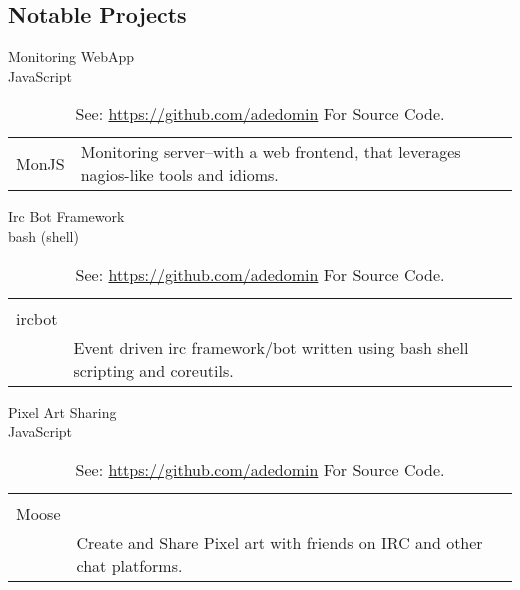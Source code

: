 \documentclass[letterpaper,]{article}
\begin{document}
\subsection{Notable Projects}\label{projects}

\begin{table}[H]
    \centering
    \begin{minipage}[t]{0.30\linewidth}
        \centering
        \caption{
            Monitoring WebApp \\ 
            \fontsize{8}{10}\selectfont JavaScript
        }
        \begin{tabularx}{\textwidth}{r|X}
            MonJS & 
            Monitoring server--with a web frontend, 
            that leverages nagios-like 
            tools and idioms. \\
        \end{tabularx}
    \end{minipage}
    \hspace{0.03\linewidth}
    \begin{minipage}[t]{0.30\linewidth}
        \centering
        \caption{
            Irc Bot Framework \\
            \fontsize{8}{10}\selectfont bash (shell)
        }
        \begin{tabularx}{\textwidth}{r|X}
            \begin{tabular}{@{}r@{}}
                bash \\
                ircbot \\
            \end{tabular} & 
            Event driven irc framework/bot 
            written using bash shell scripting and coreutils. \\
        \end{tabularx}
    \end{minipage}
    \hspace{0.03\linewidth}
    \begin{minipage}[t]{0.30\linewidth}
        \centering
        \caption{
            Pixel Art Sharing \\ 
            \fontsize{8}{10}\selectfont JavaScript
        }
        \begin{tabularx}{\textwidth}{r|X}
            \begin{tabular}{@{}r@{}}
                Captain \\
                Moose \\
            \end{tabular} &
            Create and Share Pixel art with friends on IRC
            and other chat platforms. \\
        \end{tabularx}
    \end{minipage}
    \vfill
    \caption{See: \href{https://github.com/adedomin}{https://github.com/adedomin} For Source Code.}
\end{table}
\end{document}
